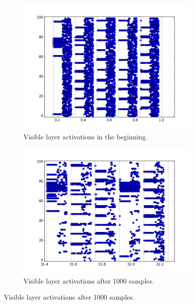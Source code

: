 \begin{figure}[h!]
	\centering
	\begin{subfigure}[t]{.45\textwidth}
  		\centering
  		\includegraphics[width=.9\linewidth]{imgs/7x7/00006_v.png}
  		\caption{Visible layer activations in the beginning.}
  		\label{fig:sub1}
	\end{subfigure}%
	\begin{subfigure}[t]{.45\textwidth}
  		\centering
  		\includegraphics[width=.9\linewidth]{imgs/7x7/01992_v.png}
  		\caption{Visible layer  activations after 1000 samples.}
  		\label{fig:sub2}
	\end{subfigure}
	

\end{figure}
